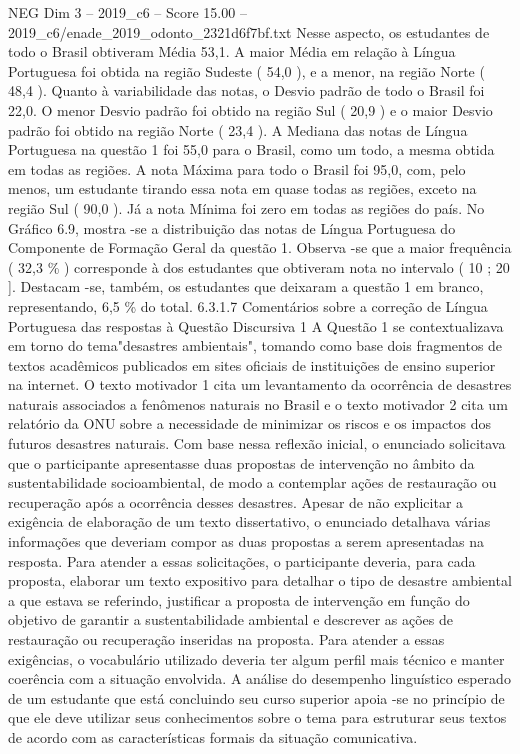 \begin{textsample}{NEG Dim 3 – 2019\_c6 – Score 15.00 – 2019\_c6/enade\_2019\_odonto\_2321d6f7bf.txt}
Nesse aspecto, os estudantes de todo o Brasil obtiveram Média 53,1.
A maior Média em relação à Língua Portuguesa foi obtida na região Sudeste ( 54,0 ), e a menor, na região Norte ( 48,4 ).
Quanto à variabilidade das notas, o Desvio padrão de todo o Brasil foi 22,0.
O menor Desvio padrão foi obtido na região Sul ( 20,9 ) e o maior Desvio padrão foi obtido na região Norte ( 23,4 ).
A Mediana das notas de Língua Portuguesa na questão 1 foi 55,0 para o Brasil, como um todo, a mesma obtida em todas as regiões.
A nota Máxima para todo o Brasil foi 95,0, com, pelo menos, um estudante tirando essa nota em quase todas as regiões, exceto na região Sul ( 90,0 ).
Já a nota Mínima foi zero em todas as regiões do país.
No Gráfico 6.9, mostra -se a distribuição das notas de Língua Portuguesa do Componente de Formação Geral da questão 1.
Observa -se que a maior frequência ( 32,3 \% ) corresponde à dos estudantes que obtiveram nota no intervalo ( 10 ; 20 ].
Destacam -se, também, os estudantes que deixaram a questão 1 em branco, representando, 6,5 \% do total. 6.3.1.7 Comentários sobre a correção de Língua Portuguesa das respostas à Questão Discursiva 1 A Questão 1 se contextualizava em torno do tema"desastres ambientais", tomando como base dois fragmentos de textos acadêmicos publicados em sites oficiais de instituições de ensino superior na internet.
O texto motivador 1 cita um levantamento da ocorrência de desastres naturais associados a fenômenos naturais no Brasil e o texto motivador 2 cita um relatório da ONU sobre a necessidade de minimizar os riscos e os impactos dos futuros desastres naturais.
Com base nessa reflexão inicial, o enunciado solicitava que o participante apresentasse duas propostas de intervenção no âmbito da sustentabilidade socioambiental, de modo a contemplar ações de restauração ou recuperação após a ocorrência desses desastres.
Apesar de não explicitar a exigência de elaboração de um texto dissertativo, o enunciado detalhava várias informações que deveriam compor as duas propostas a serem apresentadas na resposta.
Para atender a essas solicitações, o participante deveria, para cada proposta, elaborar um texto expositivo para detalhar o tipo de desastre ambiental a que estava se referindo, justificar a proposta de intervenção em função do objetivo de garantir a sustentabilidade ambiental e descrever as ações de restauração ou recuperação inseridas na proposta.
Para atender a essas exigências, o vocabulário utilizado deveria ter algum perfil mais técnico e manter coerência com a situação envolvida.
A análise do desempenho linguístico esperado de um estudante que está concluindo seu curso superior apoia -se no princípio de que ele deve utilizar seus conhecimentos sobre o tema para estruturar seus textos de acordo com as características formais da situação comunicativa.

\end{textsample}
